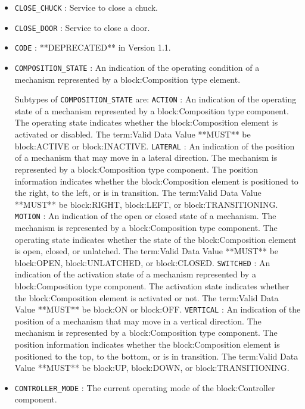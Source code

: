 \begin{itemize}
\item \texttt{CLOSE_CHUCK} : Service to close a chuck. 

\item \texttt{CLOSE_DOOR} : Service to close a door. 

\item \texttt{CODE} : **DEPRECATED** in Version 1.1. 

\item \texttt{COMPOSITION_STATE} : An indication of the operating condition of a mechanism represented by a {block:Composition} type element. 

Subtypes of \texttt{COMPOSITION_STATE} are: 
\newline\tab \texttt{ACTION} : An indication of the operating state of a mechanism represented by a {block:Composition} type component.
 The operating state indicates whether the {block:Composition} element is activated or disabled. 
 The {term:Valid Data Value} **MUST** be {block:ACTIVE} or {block:INACTIVE}. 
\newline\tab \texttt{LATERAL} : An indication of the position of a mechanism that may move in a lateral direction.   The mechanism is represented by a {block:Composition} type component. 
 The position information indicates whether the {block:Composition} element is positioned to the right, to the left, or is in transition.  
 The {term:Valid Data Value} **MUST** be {block:RIGHT}, {block:LEFT}, or {block:TRANSITIONING}. 
\newline\tab \texttt{MOTION} : An indication of the open or closed state of a mechanism.   The mechanism is represented by a {block:Composition} type component. 
 The operating state indicates whether the state of the {block:Composition} element is open, closed, or unlatched.   
 The {term:Valid Data Value} **MUST** be {block:OPEN}, {block:UNLATCHED}, or {block:CLOSED}. 
\newline\tab \texttt{SWITCHED} : An indication of the activation state of a mechanism represented by a {block:Composition} type component.
 The activation state indicates whether the {block:Composition} element is activated or not.
 The {term:Valid Data Value} **MUST** be {block:ON} or {block:OFF}. 
\newline\tab \texttt{VERTICAL} : An indication of the position of a mechanism that may move in a vertical direction. The mechanism is represented by a {block:Composition} type component. 
 The position information indicates whether the {block:Composition} element is positioned to the top, to the bottom, or is in transition.  
 The {term:Valid Data Value} **MUST** be {block:UP}, {block:DOWN}, or {block:TRANSITIONING}. 
\item \texttt{CONTROLLER_MODE} : The current operating mode of the {block:Controller} component. 


\end{itemize}
